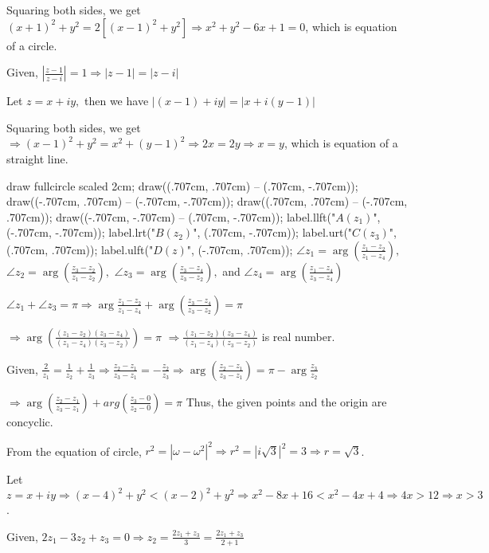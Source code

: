   Squaring both sides, we get $(x + 1)^2 + y^2 = 2[(x - 1)^2 + y^2] \Rightarrow x^2 + y^2 - 6x + 1 = 0$,
  which is equation of a circle.
\item Given, $\left|\frac{z - 1}{z - i}\right| = 1 \Rightarrow |z - 1| = |z - i|$

  Let $z = x + iy,$ then we have $|(x - 1) + iy| = |x + i(y - 1)|$

  Squaring both sides, we get $\Rightarrow (x - 1)^2 + y^2 = x^2 + (y - 1)^2 \Rightarrow 2x = 2y \Rightarrow
  x = y$, which is equation of a straight line.
\item \startplacefigure[location={left, none}]
    \startMPcode
      draw fullcircle scaled 2cm;
      draw((.707cm, .707cm) -- (.707cm, -.707cm));
      draw((-.707cm, .707cm) -- (-.707cm, -.707cm));
      draw((.707cm, .707cm) -- (-.707cm, .707cm));
      draw((-.707cm, -.707cm) -- (.707cm, -.707cm));
      label.llft("$A(z_1)$", (-.707cm, -.707cm));
      label.lrt("$B(z_2)$", (.707cm, -.707cm));
      label.urt("$C(z_3)$", (.707cm, .707cm));
      label.ulft("$D(z)$", (-.707cm, .707cm));
    \stopMPcode
  \stopplacefigure
  $\angle z_1 = \arg\left(\frac{z_1 - z_2}{z_1 - z_4}\right),$
  $\angle z_2 = \arg\left(\frac{z_3 - z_2}{z_1 - z_2}\right),$
  $\angle z_3 = \arg\left(\frac{z_3 - z_4}{z_3 - z_2}\right),$ and
  $\angle z_4 = \arg\left(\frac{z_1 - z_4}{z_3 - z_4}\right)$

  $\angle z_1 + \angle z_3 = \pi \Rightarrow \arg {\frac {z_1 - z_2} {z_1 - z_4} } + \arg \left( {\frac {z_3
      - z_4} {z_3- z_2} }\right) = \pi$

  $\Rightarrow \arg\left(\frac{(z_1 - z_2)(z_3 - z_4)}{(z_1 - z_4)(z_3 - z_2)}\right) = \pi$
  $\Rightarrow \frac{(z_1 - z_2)(z_3 - z_4)}{(z_1 - z_4)(z_3 - z_2)}$ is real number.
\item Given, $\frac{2}{z_1} = \frac{1}{z_2} + \frac{1}{z_3}\Rightarrow \frac{z_2 - z_1}{z_3 - z_1} =
  -\frac{z_2}{z_3}\Rightarrow \arg\left(\frac{z_2 - z_1}{z_3 - z_1}\right) = \pi - \arg\frac{z_3}{z_2}$

  $\Rightarrow \arg\left(\frac{z_2 - z_1}{z_3 - z_1}\right) + arg\left(\frac{z_3 - 0}{z_2 - 0}\right) = \pi$
  Thus, the given points and the origin are concyclic.
\item From the equation of circle, $r^2 = |\omega - \omega^2|^2\Rightarrow r^2 = |i\sqrt{3}|^2 = 3
  \Rightarrow r = \sqrt{3}$.
\item Let $z = x + iy\Rightarrow (x - 4)^2 + y^2 < (x - 2)^2 + y^2 \Rightarrow x^2 - 8x + 16 < x^2 - 4x +
  4\Rightarrow 4x > 12 \Rightarrow x > 3$.
\item Given, $2z_1 - 3z_2 + z_3 = 0\Rightarrow z_2 = \frac{2z_1 + z_3}{3} = \frac{2z_1 + z_3}{2 + 1}$

